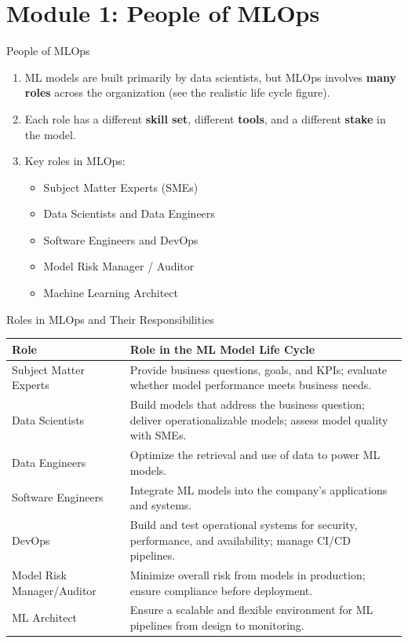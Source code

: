 \section{Module 1: People of MLOps}

\begin{frame}{People of MLOps}
\begin{enumerate}
\item<1-> ML models are built primarily by data scientists, but MLOps involves \textbf{many roles} across the organization (see the realistic life cycle figure).
\item<2-> Each role has a different \textbf{skill set}, different \textbf{tools}, and a different \textbf{stake} in the model.
\item<3-> Key roles in MLOps:
    \begin{itemize}
    \item Subject Matter Experts (SMEs)
    \item Data Scientists and Data Engineers
    \item Software Engineers and DevOps
    \item Model Risk Manager / Auditor
    \item Machine Learning Architect
    \end{itemize}
\end{enumerate}
\end{frame}

\begin{frame}{Roles in MLOps and Their Responsibilities}
\small
\begin{table}
\centering
\renewcommand{\arraystretch}{1.25}
\scriptsize
\begin{tabular}{|p{3.2cm}|p{10cm}|}
\hline
\textbf{Role} & \textbf{Role in the ML Model Life Cycle} \\ \hline
Subject Matter Experts & Provide business questions, goals, and KPIs; evaluate whether model performance meets business needs. \\ \hline
Data Scientists & Build models that address the business question; deliver operationalizable models; assess model quality with SMEs. \\ \hline
Data Engineers & Optimize the retrieval and use of data to power ML models. \\ \hline
Software Engineers & Integrate ML models into the company's applications and systems. \\ \hline
DevOps & Build and test operational systems for security, performance, and availability; manage CI/CD pipelines. \\ \hline
Model Risk Manager/Auditor & Minimize overall risk from models in production; ensure compliance before deployment. \\ \hline
ML Architect & Ensure a scalable and flexible environment for ML pipelines from design to monitoring. \\ \hline
\end{tabular}
\end{table}
\end{frame}

